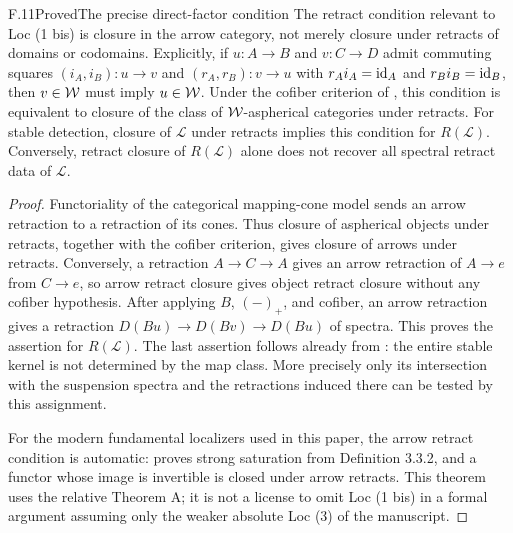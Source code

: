 \begin{claim}{F.11}{Proved}{The precise direct-factor condition}
The retract condition relevant to Loc (1 bis) is closure in the arrow
category, not merely closure under retracts of domains or codomains.
Explicitly, if $u:A\to B$ and $v:C\to D$ admit commuting squares
$(i_A,i_B):u\to v$ and $(r_A,r_B):v\to u$ with
$r_Ai_A=\mathrm{id}_A$ and $r_Bi_B=\mathrm{id}_B$, then $v\in\mathcal{W}$ must imply
$u\in\mathcal{W}$. Under the cofiber criterion of , this condition
is equivalent to closure of the class of $\mathcal{W}$-aspherical categories under
retracts. For stable detection, closure of $\mathcal L$ under retracts
implies this condition for $R(\mathcal L)$. Conversely,
retract closure of $R(\mathcal L)$ alone does not recover all spectral
retract data of $\mathcal L$.
\end{claim}
\begin{proof}
Functoriality of the categorical mapping-cone model sends an arrow
retraction to a retraction of its cones. Thus closure of aspherical
objects under retracts, together with the cofiber criterion, gives
closure of arrows under retracts. Conversely, a retraction $A\to C\to A$
gives an arrow retraction of $A\to e$ from $C\to e$, so arrow retract
closure gives object retract closure without any cofiber hypothesis.
After applying $B$, $(-)_+$, and cofiber, an arrow retraction gives a
retraction $D(Bu)\to D(Bv)\to D(Bu)$ of spectra. This proves the
assertion for $R(\mathcal L)$. The last assertion follows already from
: the entire stable kernel is not determined by the map
class. More precisely only its intersection with the suspension spectra
and the retractions induced there can be tested by this assignment.

For the modern fundamental localizers used in this paper, the arrow
retract condition is automatic:
\citet[Proposition 4.2.4, p.~183]{RootCisinski2006} proves strong saturation
from Definition 3.3.2, and a functor whose image is invertible is closed
under arrow retracts. This theorem uses the relative Theorem A; it is
not a license to omit Loc (1 bis) in a formal argument assuming only
the weaker absolute Loc (3) of the manuscript.
\end{proof}

